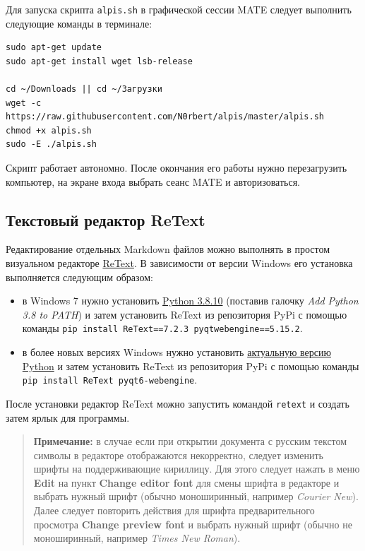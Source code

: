 \documentclass[
  a4paper,
]{book}
\providecommand{\tightlist}{%
  \setlength{\itemsep}{0pt}\setlength{\parskip}{0pt}}
\theoremstyle{definition}
\theoremstyle{definition}
\theoremstyle{definition}
\theoremstyle{definition}
\theoremstyle{remark}
\begin{document}
Для запуска скрипта \texttt{alpis.sh} в графической сессии MATE следует выполнить следующие команды в терминале:

\begin{verbatim}
sudo apt-get update
sudo apt-get install wget lsb-release

cd ~/Downloads || cd ~/Загрузки
wget -c https://raw.githubusercontent.com/N0rbert/alpis/master/alpis.sh
chmod +x alpis.sh
sudo -E ./alpis.sh
\end{verbatim}

Скрипт работает автономно. После окончания его работы нужно перезагрузить компьютер, на экране входа выбрать сеанс MATE и авторизоваться.

\subsection{Текстовый редактор ReText}\label{software-retext}

Редактирование отдельных Markdown файлов можно выполнять в простом визуальном редакторе \href{https://github.com/retext-project/retext}{ReText}. В зависимости от версии Windows его установка выполняется следующим образом:

\begin{itemize}
\tightlist
\item
  в Windows 7 нужно установить \href{https://www.python.org/ftp/python/3.8.10/python-3.8.10-amd64.exe}{Python 3.8.10} (поставив галочку \emph{Add Python 3.8 to PATH}) и затем установить ReText из репозитория PyPi с помощью команды \texttt{pip\ install\ ReText==7.2.3\ pyqtwebengine==5.15.2}.
\item
  в более новых версиях Windows нужно установить \href{https://www.python.org/downloads/windows/}{актуальную версию Python} и затем установить ReText из репозитория PyPi с помощью команды \texttt{pip\ install\ ReText\ pyqt6-webengine}.
\end{itemize}

После установки редактор ReText можно запустить командой \texttt{retext} и создать затем ярлык для программы.

\begin{quote}
\textbf{Примечание:} в случае если при открытии документа с русским текстом символы в редакторе отображаются некорректно, следует изменить шрифты на поддерживающие кириллицу.
Для этого следует нажать в меню \textbf{Edit} на пункт \textbf{Change editor font} для смены шрифта в редакторе и выбрать нужный шрифт (обычно моноширинный, например \emph{Courier New}).\\
Далее следует повторить действия для шрифта предварительного просмотра \textbf{Change preview font} и выбрать нужный шрифт (обычно не моноширинный, например \emph{Times New Roman}).
\end{quote}
\end{document}
